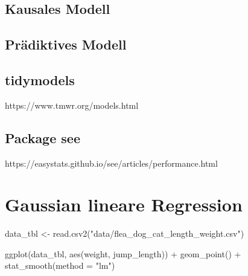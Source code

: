 \documentclass[
  letterpaper,
  DIV=11,
  oneside]{scrreport}
\newenvironment{Shaded}{\begin{snugshade}}{\end{snugshade}}
\newcommand{\AttributeTok}[1]{\textcolor[rgb]{0.40,0.45,0.13}{#1}}
\newcommand{\FunctionTok}[1]{\textcolor[rgb]{0.28,0.35,0.67}{#1}}
\newcommand{\NormalTok}[1]{\textcolor[rgb]{0.00,0.23,0.31}{#1}}
\newcommand{\OtherTok}[1]{\textcolor[rgb]{0.00,0.23,0.31}{#1}}
\newcommand{\SpecialCharTok}[1]{\textcolor[rgb]{0.37,0.37,0.37}{#1}}
\newcommand{\StringTok}[1]{\textcolor[rgb]{0.13,0.47,0.30}{#1}}
\begin{document}
\hypertarget{kausales-modell}{%
\section*{Kausales Modell}\label{kausales-modell}}

\hypertarget{pruxe4diktives-modell}{%
\section*{Prädiktives Modell}\label{pruxe4diktives-modell}}

\hypertarget{tidymodels}{%
\section*{tidymodels}\label{tidymodels}}

https://www.tmwr.org/models.html

\hypertarget{package-see}{%
\section*{Package see}\label{package-see}}

https://easystats.github.io/see/articles/performance.html

\hypertarget{gaussian-lineare-regression}{%
\chapter{Gaussian lineare
Regression}\label{gaussian-lineare-regression}}

\begin{Shaded}
\begin{Highlighting}[]
\NormalTok{data\_tbl }\OtherTok{\textless{}{-}} \FunctionTok{read.csv2}\NormalTok{(}\StringTok{"data/flea\_dog\_cat\_length\_weight.csv"}\NormalTok{)}
\end{Highlighting}
\end{Shaded}

\begin{Shaded}
\begin{Highlighting}[]
\FunctionTok{ggplot}\NormalTok{(data\_tbl, }\FunctionTok{aes}\NormalTok{(weight, jump\_length)) }\SpecialCharTok{+}
  \FunctionTok{geom\_point}\NormalTok{() }\SpecialCharTok{+}
  \FunctionTok{stat\_smooth}\NormalTok{(}\AttributeTok{method =} \StringTok{"lm"}\NormalTok{)}
\end{Highlighting}
\end{Shaded}
\end{document}

